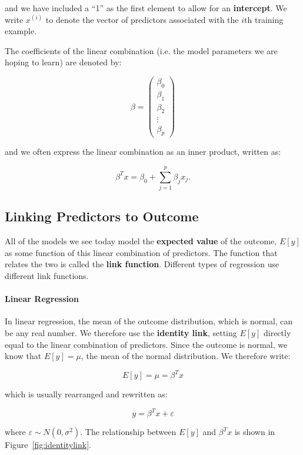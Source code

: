and we have included a ``1'' as the first element to allow for an \textbf{intercept}. We write $x^{(i)}$ to denote the vector of predictors associated with the $i$th training example.

The coefficients of the linear combination (i.e. the model parameters we are hoping to learn) are denoted by:

$$ \beta = \begin{pmatrix}
\beta_0 \\
           \beta_{1} \\
           \beta_{2} \\
           \vdots \\
           \beta_{p}
         \end{pmatrix} $$

and we often express the linear combination as an inner product, written as:

$$ \beta^T x = \beta_0 + \sum_{j=1}^p \beta_j x_j. $$

\subsection{Linking Predictors to Outcome}

All of the models we see today model the \textbf{expected value} of the outcome, $E[y]$ as some function of this linear combination of predictors. The function that relates the two is called the \textbf{link function}. Different types of regression use different link functions.

\paragraph{Linear Regression} In linear regression, the mean of the outcome distribution, which is normal, can be any real number. We therefore use the \textbf{identity link}, setting $E[y]$ directly equal to the linear combination of predictors. Since the outcome is normal, we know that $E[y] = \mu$, the mean of the normal distribution. We therefore write:

$$ E[y] = \mu = \beta^T x $$

which is usually rearranged and rewritten as:

$$ y = \beta^T x + \varepsilon $$

where $\varepsilon \sim N(0, \sigma^2)$. The relationship between $E[y]$ and $\beta^T x$ is shown in Figure~\ref{fig:identitylink}.

